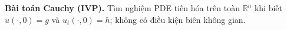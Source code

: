 \textbf{Bài toán Cauchy (IVP).}
Tìm nghiệm PDE tiến hóa trên toàn $\mathbb{R}^n$ khi biết $u(\cdot,0)=g$ và $u_t(\cdot,0)=h$; không có điều kiện biên không gian.
